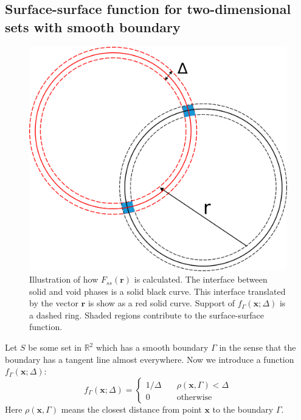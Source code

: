 \documentclass[preprint]{elsarticle}
\begin{document}
\subsection{Surface-surface function for two-dimensional sets with smooth boundary}
\label{sec:fss-2d}
\begin{figure}
  \centering
  \includegraphics[width=0.8\linewidth]{images/Fss.png}
  \caption[]{Illustration of how $F_{ss}(\bm{r})$ is calculated. The interface
    between solid and void phases is a solid black curve. This interface
    translated by the vector $\bm{r}$ is show as a red solid curve. Support of
    $f_\Gamma(\bm{x}; \Delta)$ is a dashed ring. Shaded regions contribute to
    the surface-surface function.}
  \label{fig:Fss-explained}
\end{figure}
Let $S$ be some set in $\mathbb{R}^2$ which has a smooth boundary $\Gamma$ in
the sense that the boundary has a tangent line almost everywhere. Now we
introduce a function $f_\Gamma(\bm{x}; \Delta)$:
\begin{equation}
  f_\Gamma(\bm{x}; \Delta) = \left\{
  \begin{array}{ll}
    1/\Delta & \quad \rho(\bm{x}, \Gamma) < \Delta \\
    0 & \quad \text{otherwise}
  \end{array}
  \right. \label{eq:delta-sequence}
\end{equation}
Here $\rho(\bm{x}, \Gamma)$ means the closest distance from point $\bm{x}$ to the
boundary $\Gamma$.
\end{document}
